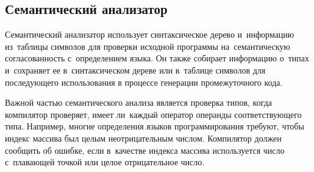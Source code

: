 \subsection{Семантический анализатор} \label{sub115}

Семантический анализатор использует синтаксическое дерево и~информацию из~таблицы символов для проверки исходной программы на~семантическую согласованность с~определением языка. Он также собирает информацию о~типах и~сохраняет ее в~синтаксическом дереве или в~таблице символов для последующего использования в процессе генерации промежуточного кода.

Важной частью семантического анализа является проверка типов, когда компилятор проверяет, имеет ли~каждый оператор операнды соответствующего типа. Например, многие определения языков программирования требуют, чтобы индекс массива был целым неотрицательным числом. Компилятор должен сообщить об ошибке, если в~качестве индекса массива используется число с~плавающей точкой или целое отрицательное число.